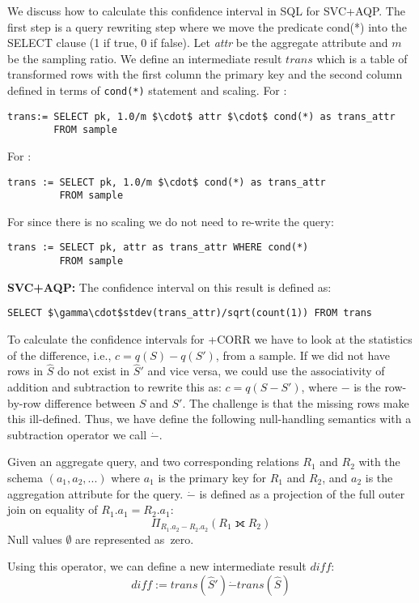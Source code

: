 We discuss how to calculate this confidence interval in SQL for SVC+AQP.
The first step is a query rewriting step where we move the predicate \textsf{cond(*)} into the SELECT clause (1 if true, 0 if false). 
Let \emph{attr} be the aggregate attribute and $m$ be the sampling ratio. 
We define an intermediate result $trans$ which is a table of transformed rows with the first column the 
primary key and the second column defined in terms of \texttt{cond(*)} statement and scaling.
For \sumfunc:
\begin{lstlisting}[mathescape,basicstyle={\scriptsize}]
trans:= SELECT pk, 1.0/m $\cdot$ attr $\cdot$ cond(*) as trans_attr
        FROM sample 
\end{lstlisting} 
For \countfunc:
\begin{lstlisting}[mathescape,basicstyle={\scriptsize}]
trans := SELECT pk, 1.0/m $\cdot$ cond(*) as trans_attr
         FROM sample
\end{lstlisting}
For \avgfunc since there is no scaling we do not need to re-write the query:
\begin{lstlisting}[mathescape,basicstyle={\scriptsize}]
trans := SELECT pk, attr as trans_attr WHERE cond(*) 
         FROM sample
\end{lstlisting}

\vspace{0.25em}

\noindent\textbf{SVC+AQP: } The confidence interval on this result is defined 
as:
\begin{lstlisting}[mathescape,basicstyle={\scriptsize}]
SELECT $\gamma\cdot$stdev(trans_attr)/sqrt(count(1)) FROM trans
\end{lstlisting}

\vspace{0.25em}

To calculate the confidence intervals for \svcnospace+CORR we have to look at the statistics of the difference, i.e., $c = q(S) - q(S')$, from a sample.
If we did not have rows in $\widehat{S}$ do not exist in $\widehat{S}'$ and vice versa, we could use the associativity of addition and subtraction to rewrite this as:
$c = q(S - S')$, where $-$ is the row-by-row difference between $S$ and $S'$.
The challenge is that the missing rows make this ill-defined.
Thus, we have define the following null-handling semantics with a subtraction operator we call $\dot{-}$.
\begin{definition} Given an aggregate query, and two corresponding relations $R_1$ and $R_2$ with the schema $(a_1, a_2, ...)$ where $a_1$ is the primary key for $R_1$ and $R_2$, and $a_2$ is the aggregation attribute for the query. 
$\dot{-}$ is defined as a projection of the full outer join on equality of $R_1.a_1 = R_2.a_1$: \[ \Pi_{R_1.a_2 - R_2.a_2} ( R_1 \fullouterjoin R_2 ) \]
Null values $\emptyset$ are represented as~zero.
\end{definition}
Using this operator, we can define a new intermediate result $diff$:
\[diff := trans(\widehat{S}') \dot{-} trans(\widehat{S}) \]

